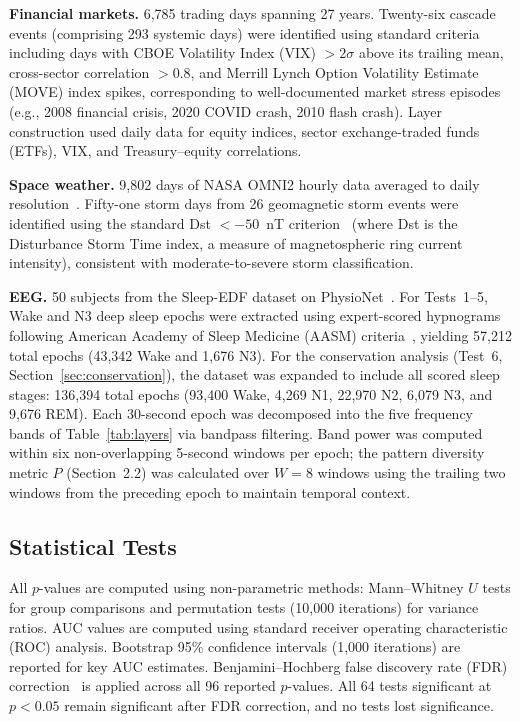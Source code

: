 \documentclass[aip,cha,reprint,amsmath,amssymb,final,floatfix]{revtex4-2}
\begin{document}
\textbf{Financial markets.} 6,785 trading days spanning 27 years. Twenty-six cascade events (comprising 293 systemic days) were identified using standard criteria including days with CBOE Volatility Index (VIX) $> 2\sigma$ above its trailing mean, cross-sector correlation $> 0.8$, and Merrill Lynch Option Volatility Estimate (MOVE) index spikes, corresponding to well-documented market stress episodes (e.g., 2008 financial crisis, 2020 COVID crash, 2010 flash crash). Layer construction used daily data for equity indices, sector exchange-traded funds (ETFs), VIX, and Treasury--equity correlations.

\textbf{Space weather.} 9,802 days of NASA OMNI2 hourly data averaged to daily resolution~\cite{papitashvili2020}. Fifty-one storm days from 26 geomagnetic storm events were identified using the standard Dst $< -50$~nT criterion~\cite{gonzalez1994} (where Dst is the Disturbance Storm Time index, a measure of magnetospheric ring current intensity), consistent with moderate-to-severe storm classification.

\textbf{EEG.} 50 subjects from the Sleep-EDF dataset on PhysioNet~\cite{kemp2000,goldberger2000}. For Tests~1--5, Wake and N3 deep sleep epochs were extracted using expert-scored hypnograms following American Academy of Sleep Medicine (AASM) criteria~\cite{berry2017}, yielding 57,212 total epochs (43,342 Wake and 1,676 N3). For the conservation analysis (Test~6, Section~\ref{sec:conservation}), the dataset was expanded to include all scored sleep stages: 136,394 total epochs (93,400 Wake, 4,269 N1, 22,970 N2, 6,079 N3, and 9,676 REM). Each 30-second epoch was decomposed into the five frequency bands of Table~\ref{tab:layers} via bandpass filtering. Band power was computed within six non-overlapping 5-second windows per epoch; the pattern diversity metric $P$ (Section~2.2) was calculated over $W = 8$ windows using the trailing two windows from the preceding epoch to maintain temporal context.

\subsection{Statistical Tests}

All $p$-values are computed using non-parametric methods: Mann--Whitney $U$ tests for group comparisons and permutation tests (10,000 iterations) for variance ratios. AUC values are computed using standard receiver operating characteristic (ROC) analysis. Bootstrap 95\% confidence intervals (1,000 iterations) are reported for key AUC estimates. Benjamini--Hochberg false discovery rate (FDR) correction~\cite{benjamini1995} is applied across all 96 reported $p$-values. All 64 tests significant at $p < 0.05$ remain significant after FDR correction, and no tests lost significance.
\end{document}
